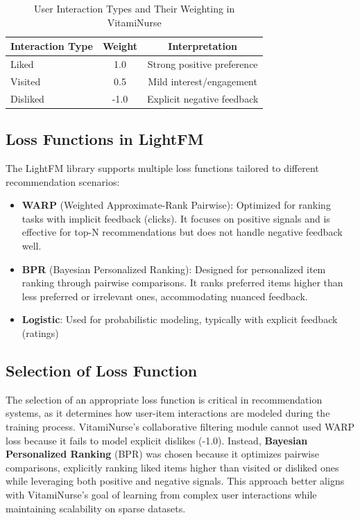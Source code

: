 \begin{table}[h]
\centering
\begin{tabular}{lcc}
\toprule
\textbf{Interaction Type} & \textbf{Weight} & \textbf{Interpretation} \\
\midrule
Liked & 1.0 & Strong positive preference \\
Visited & 0.5 & Mild interest/engagement \\
Disliked & -1.0 & Explicit negative feedback \\
\bottomrule
\end{tabular}
\caption{User Interaction Types and Their Weighting in VitamiNurse}
\label{tab:interaction_weights}
\end{table}

\subsection{Loss Functions in LightFM}

The LightFM library supports multiple loss functions tailored to different recommendation scenarios:
\begin{itemize}
    \item \textbf{WARP} (Weighted Approximate-Rank Pairwise): Optimized for ranking tasks with implicit feedback (clicks). It focuses on positive signals and is effective for top-N recommendations but does not handle negative feedback well.
    \item \textbf{BPR} (Bayesian Personalized Ranking): Designed for personalized item ranking through pairwise comparisons. It ranks preferred items higher than less preferred or irrelevant ones, accommodating nuanced feedback.
    \item \textbf{Logistic}: Used for probabilistic modeling, typically with explicit feedback (ratings)
\end{itemize}

\subsection{Selection of Loss Function}

The selection of an appropriate loss function is critical in recommendation systems, as it determines how user-item interactions are modeled during the training process. 
VitamiNurse’s collaborative filtering module cannot used WARP loss because it fails to model explicit dislikes (-1.0). Instead, \textbf{Bayesian Personalized Ranking} (BPR) was chosen because it optimizes pairwise comparisons, explicitly ranking liked items higher than visited or disliked ones while leveraging both positive and negative signals. This approach better aligns with VitamiNurse’s goal of learning from complex user interactions while maintaining scalability on sparse datasets.


